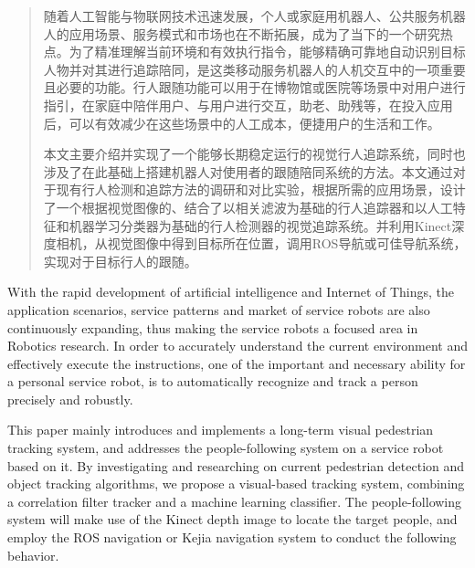 
\begin{abstract}
  随着人工智能与物联网技术迅速发展，个人或家庭用机器人、公共服务机器人的应用场景、服务模式和市场也在不断拓展，成为了当下的一个研究热点。为了精准理解当前环境和有效执行指令，能够精确可靠地自动识别目标人物并对其进行追踪陪同，是这类移动服务机器人的人机交互中的一项重要且必要的功能。行人跟随功能可以用于在博物馆或医院等场景中对用户进行指引，在家庭中陪伴用户、与用户进行交互，助老、助残等，在投入应用后，可以有效减少在这些场景中的人工成本，便捷用户的生活和工作。

  本文主要介绍并实现了一个能够长期稳定运行的视觉行人追踪系统，同时也涉及了在此基础上搭建机器人对使用者的跟随陪同系统的方法。本文通过对于现有行人检测和追踪方法的调研和对比实验，根据所需的应用场景，设计了一个根据视觉图像的、结合了以相关滤波为基础的行人追踪器和以人工特征和机器学习分类器为基础的行人检测器的视觉追踪系统。并利用Kinect深度相机，从视觉图像中得到目标所在位置，调用ROS导航或可佳导航系统，实现对于目标行人的跟随。

\end{abstract}

\begin{enabstract}

  With the rapid development of artificial intelligence and Internet of Things, the application scenarios, service patterns and market of service robots are also continuously expanding, thus making the service robots a focused area in Robotics research. In order to accurately understand the current environment and effectively execute the instructions, one of the important and necessary ability for a personal service robot, is to automatically recognize and track a person precisely and robustly.

  This paper mainly introduces and implements a long-term visual pedestrian tracking system, and addresses the people-following system on a service robot based on it. By investigating and researching on current pedestrian detection and object tracking algorithms, we propose a visual-based tracking system, combining a correlation filter tracker and a machine learning classifier. The people-following system will make use of the Kinect depth image to locate the target people, and employ the ROS navigation or Kejia navigation system to conduct the following behavior.

\end{enabstract}
